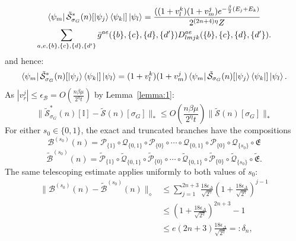 \documentclass[aps,floatfix,10pt,amssymb,amsfont,amsmath,superscriptaddress,float,nofootinbib,longbibliography,nobalancelastpage,twocolumn]{revtex4-2}
\begin{document}
\begin{widetext}
\begin{multline}
     \bra{\psi_m}\tilde{\mathcal{S}}^*_{\sigma_G}(n)[\ket{\psi_j}\bra{\psi_k}]\ket{\psi_l} = \frac{((1+v_l^k)(1+v_m^j)e^{-\frac{\beta}{2}(E_j+E_k)}}{2^{(2n+4)\eta}Z}\\\sum_{a,e,\{b\},\{c\},\{d\},\{d'\}} \bar{g}^{ae}(\{b\},\{c\},\{d\},\{d'\}) D^{ae}_{lmjk}(\{b\},\{c\},\{d\},\{d'\}).
     \label{eq:relabelline-symmetrized}
\end{multline}
and hence:
\begin{equation}
    \bra{\psi_m}\tilde{\mathcal{S}}^*_{\sigma_G}(n)[\ket{\psi_j}\bra{\psi_k}]\ket{\psi_l}
    =(1+v_l^k)(1+v_m^j)\bra{\psi_m}\tilde{\mathcal{S}}_{\sigma_G}(n)[\ket{\psi_j}\bra{\psi_k}]\ket{\psi_l}.
\end{equation}
As $|v_r^j| \leq \epsilon_{\mathcal{B}} = O(\frac{n\beta \mu}{2^{\eta}t})$ by Lemma~\ref{lemma:1}:
\begin{equation}
    \|\tilde{\mathcal{S}}^*_{\sigma_G}(n)[\mathbb{I}] - \tilde{\mathcal{S}}(n)[\sigma_G]\|_* \leq O\left(\frac{n\beta \mu}{2^{\eta}t}\right)\|\tilde{\mathcal{S}}(n)[\sigma_G]\|_*
    \label{eq:Boutput}
\end{equation}
For either $s_0\in\{0,1\}$, the exact and truncated branches have the
compositions
\begin{equation}
    \mathcal{B}^{(s_0)}(n) = \mathcal{P}_{\{1\}}\circ\mathcal{Q}_{\{0,1\}}\circ\mathcal{P}_{\{0\}}\circ\cdots\circ\mathcal{Q}_{\{0,1\}}\circ\mathcal{P}_{\{0\}}\circ\mathcal{Q}_{\{s_0\}}\circ\mathfrak{E}
\end{equation}
\begin{equation}
    \tilde{\mathcal{B}}^{(s_0)}(n) = \tilde{\mathcal{P}}_{\{1\}}\circ\tilde {\mathcal{Q}}_{\{0,1\}}\circ\tilde{\mathcal{P}}_{\{0\}}\circ\cdots\circ\tilde{\mathcal{Q}}_{\{0,1\}}\circ\tilde{\mathcal{P}}_{\{0\}}\circ\tilde{\mathcal{Q}}_{\{s_0\}}\circ\tilde{\mathfrak{E}}.
\end{equation}
The same telescoping estimate applies uniformly to both values of $s_0$:
\begin{align}
    \|\mathcal{B}^{(s_0)}(n)-\tilde{\mathcal{B}}^{(s_0)}(n)\|_{\diamond}
    &\leq  \sum_{j=1}^{2n+3}\frac{18\epsilon_{\Delta}}{\sqrt{2^{\eta}}}\left(1+\frac{18\epsilon_{\Delta}}{\sqrt{2^{\eta}}}\right)^{j-1}\\
    &\leq  (1+\frac{18\epsilon_{\Delta}}{\sqrt{2^{\eta}}})^{2n+3}-1\\
     &\leq e(2n+3)\frac{18\epsilon_{\Delta}}{\sqrt{2^{\eta}}}=: \delta_n,
\end{align}

\end{widetext}
\end{document}
